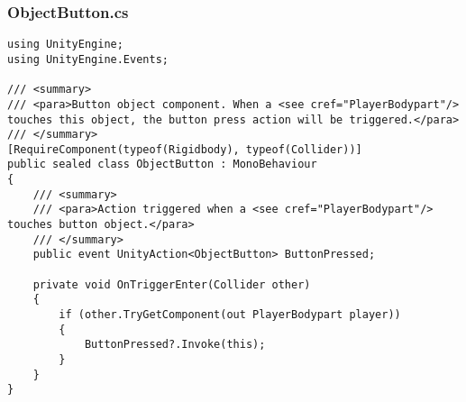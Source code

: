 \subsubsection*{ObjectButton.cs}
\begin{verbatim}
using UnityEngine;
using UnityEngine.Events;

/// <summary>
/// <para>Button object component. When a <see cref="PlayerBodypart"/> touches this object, the button press action will be triggered.</para>
/// </summary>
[RequireComponent(typeof(Rigidbody), typeof(Collider))]
public sealed class ObjectButton : MonoBehaviour
{
    /// <summary>
    /// <para>Action triggered when a <see cref="PlayerBodypart"/> touches button object.</para>
    /// </summary>
    public event UnityAction<ObjectButton> ButtonPressed;

    private void OnTriggerEnter(Collider other)
    {
        if (other.TryGetComponent(out PlayerBodypart player))
        {
            ButtonPressed?.Invoke(this);
        }
    }
}
\end{verbatim}
